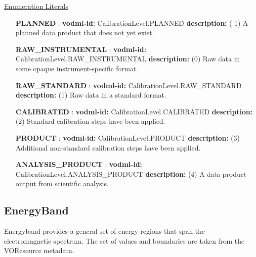   \noindent \underline{Enumeration Literals}
  \vspace{-\parsep}
  \small
  \begin{itemize}
  
    \item[\textbf{PLANNED}]: \textbf{vodml-id:} CalibrationLevel.PLANNED \newline
          \textbf{description:} (-1) A planned data product that does not yet exist.
    \item[\textbf{RAW\_INSTRUMENTAL}]: \textbf{vodml-id:} CalibrationLevel.RAW\_INSTRUMENTAL \newline
          \textbf{description:} (0) Raw data in some opaque instrument-specific format.
    \item[\textbf{RAW\_STANDARD}]: \textbf{vodml-id:} CalibrationLevel.RAW\_STANDARD \newline
          \textbf{description:} (1) Raw data in a standard format.
    \item[\textbf{CALIBRATED}]: \textbf{vodml-id:} CalibrationLevel.CALIBRATED \newline
          \textbf{description:} (2) Standard calibration steps have been applied.
    \item[\textbf{PRODUCT}]: \textbf{vodml-id:} CalibrationLevel.PRODUCT \newline
          \textbf{description:} (3) Additional non-standard calibration steps have been applied.
    \item[\textbf{ANALYSIS\_PRODUCT}]: \textbf{vodml-id:} CalibrationLevel.ANALYSIS\_PRODUCT \newline
          \textbf{description:} (4) A data product output from scientific analysis.
  \end{itemize}
  \normalsize


  \subsection{EnergyBand}
  \label{sect:EnergyBand}

  Energyband provides a general set of energy regions that span the electromagnetic spectrum. The set of values and boundaries are taken from the VOResource metadata. 

